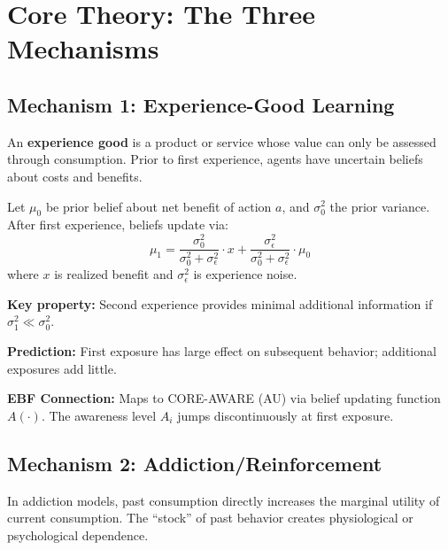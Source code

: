 \section{Core Theory: The Three Mechanisms}
\label{sec:hf-theory}

\subsection{Mechanism 1: Experience-Good Learning}

An \textbf{experience good} is a product or service whose value can only be assessed through
consumption. Prior to first experience, agents have uncertain beliefs about costs and benefits.

\begin{tcolorbox}[colback=gray!5!white, colframe=gray!75!black,
    title=Definition: Experience-Good Learning]
Let $\mu_0$ be prior belief about net benefit of action $a$, and $\sigma^2_0$ the prior variance.
After first experience, beliefs update via:
\begin{equation}
\mu_1 = \frac{\sigma^2_0}{\sigma^2_0 + \sigma^2_\epsilon} \cdot x + \frac{\sigma^2_\epsilon}{\sigma^2_0 + \sigma^2_\epsilon} \cdot \mu_0
\end{equation}
where $x$ is realized benefit and $\sigma^2_\epsilon$ is experience noise.

\textbf{Key property:} Second experience provides minimal additional information if $\sigma^2_1 \ll \sigma^2_0$.
\end{tcolorbox}

\textbf{Prediction:} First exposure has large effect on subsequent behavior; additional exposures add little.

\textbf{EBF Connection:} Maps to CORE-AWARE (AU) via belief updating function $A(\cdot)$.
The awareness level $A_i$ jumps discontinuously at first exposure.

\subsection{Mechanism 2: Addiction/Reinforcement}

In addiction models, past consumption directly increases the marginal utility of current
consumption. The ``stock'' of past behavior creates physiological or psychological dependence.

